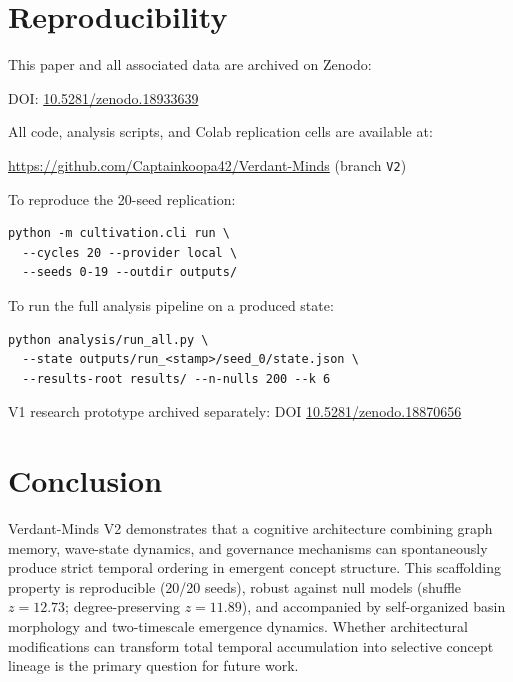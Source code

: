 \documentclass[11pt]{article}
\begin{document}
\section{Reproducibility}

This paper and all associated data are archived on Zenodo:
\begin{center}
DOI: \href{https://doi.org/10.5281/zenodo.18933639}{10.5281/zenodo.18933639}
\end{center}

All code, analysis scripts, and Colab replication cells are available at:
\begin{center}
\url{https://github.com/Captainkoopa42/Verdant-Minds} (branch \texttt{V2})
\end{center}

To reproduce the 20-seed replication:
\begin{verbatim}
python -m cultivation.cli run \
  --cycles 20 --provider local \
  --seeds 0-19 --outdir outputs/
\end{verbatim}

To run the full analysis pipeline on a produced state:
\begin{verbatim}
python analysis/run_all.py \
  --state outputs/run_<stamp>/seed_0/state.json \
  --results-root results/ --n-nulls 200 --k 6
\end{verbatim}

V1 research prototype archived separately: DOI \href{https://doi.org/10.5281/zenodo.18870656}{10.5281/zenodo.18870656}

\section{Conclusion}

Verdant-Minds V2 demonstrates that a cognitive architecture combining graph memory, wave-state dynamics, and governance mechanisms can spontaneously produce strict temporal ordering in emergent concept structure. This scaffolding property is reproducible (20/20 seeds), robust against null models (shuffle $z = 12.73$; degree-preserving $z = 11.89$), and accompanied by self-organized basin morphology and two-timescale emergence dynamics. Whether architectural modifications can transform total temporal accumulation into selective concept lineage is the primary question for future work.
\end{document}
